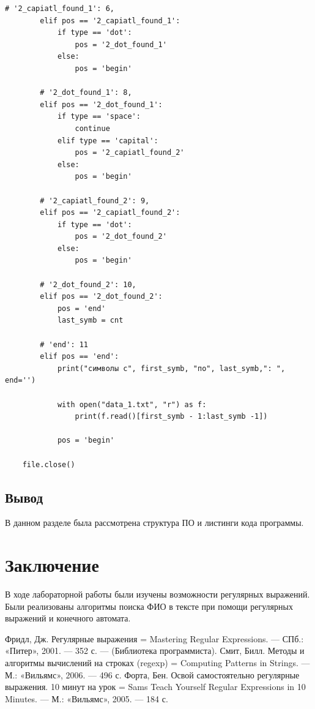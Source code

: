 \documentclass[12pt]{report}
\begin{document}
\begin{lstlisting}[label=Avt,caption=Использование конечного автомата]
        # '2_capiatl_found_1': 6,
        elif pos == '2_capiatl_found_1':
            if type == 'dot':
                pos = '2_dot_found_1'
            else:
                pos = 'begin'

        # '2_dot_found_1': 8,
        elif pos == '2_dot_found_1':
            if type == 'space':
                continue
            elif type == 'capital':
                pos = '2_capiatl_found_2'
            else:
                pos = 'begin'

        # '2_capiatl_found_2': 9,
        elif pos == '2_capiatl_found_2':
            if type == 'dot':
                pos = '2_dot_found_2'
            else:
                pos = 'begin'

        # '2_dot_found_2': 10,
        elif pos == '2_dot_found_2':
            pos = 'end'
            last_symb = cnt

        # 'end': 11
        elif pos == 'end':
            print("символы с", first_symb, "по", last_symb,": ", end='')

            with open("data_1.txt", "r") as f:
                print(f.read()[first_symb - 1:last_symb -1])

            pos = 'begin'

    file.close()

\end{lstlisting}


\section{Вывод}
В данном разделе была рассмотрена структура ПО и листинги кода программы.


\chapter*{Заключение}
В ходе лабораторной работы были изучены возможности регулярных выражений. Были реализованы алгоритмы поиска ФИО в тексте при помощи регулярных выражений и конечного автомата.


\begin{thebibliography}{3}
	Фридл, Дж. Регулярные выражения = Mastering Regular Expressions. — СПб.: «Питер», 2001. — 352 с. — (Библиотека программиста). 	
	Смит, Билл. Методы и алгоритмы вычислений на строках (regexp) = Computing Patterns in Strings. — М.: «Вильямс», 2006. — 496 с.
	Форта, Бен. Освой самостоятельно регулярные выражения. 10 минут на урок = Sams Teach Yourself Regular Expressions in 10 Minutes. — М.: «Вильямс», 2005. — 184 с.
\end{thebibliography}
\end{document}
